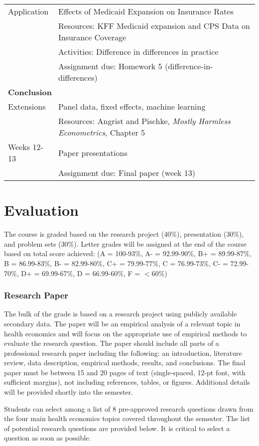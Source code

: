 \documentclass{article}
\begin{document}
\begin{longtable}{lp{13cm}}
  \hline
  Application & Effects of Medicaid Expansion on Insurance Rates \\
              & Resources: KFF Medicaid expansion and CPS Data on Insurance Coverage \\
              & Activities: Difference in differences in practice \citep{courtemanche2017} \\
              & Assignment due: Homework 5 (difference-in-differences) \\
  \hline
  \multicolumn{2}{l}{\textbf{Conclusion}} \\
  \hline\hline
  Extensions & Panel data, fixed effects, machine learning \\
             & Resources:  Angrist and Pischke, \textit{Mostly Harmless Econometrics}, Chapter 5 \\
  \hline
  Weeks 12-13 & Paper presentations \\
              & Assignment due: Final paper (week 13)
\end{longtable}


\section*{Evaluation}
The course is graded based on the research project (40\%), presentation (30\%), and problem sets (30\%). Letter grades will be assigned at the end of the course based on total score achieved:
(A = 100-93\%, A- = 92.99-90\%, B+ = 89.99-87\%, B = 86.99-83\%, B- = 82.99-80\%, C+ = 79.99-77\%, C = 76.99-73\%, C- = 72.99-70\%, D+ = 69.99-67\%, D = 66.99-60\%, F = $<$60\%)


\subsubsection*{Research Paper}
The bulk of the grade is based on a research project using publicly available secondary data. The paper will be an empirical analysis of a relevant topic in health economics and will focus on the appropriate use of empirical methods to evaluate the research question. The paper should include all parts of a professional research paper including the following:  an introduction, literature review, data description, empirical methods, results, and conclusions. The final paper must be between 15 and 20 pages of text (single-spaced, 12-pt font, with sufficient margins), not including references, tables, or figures. Additional details will be provided shortly into the semester.

Students can select among a list of 8 pre-approved research questions drawn from the four main health economics topics covered throughout the semester. The list of potential research questions are provided below. It is critical to select a question as soon as possible.
\end{document}
